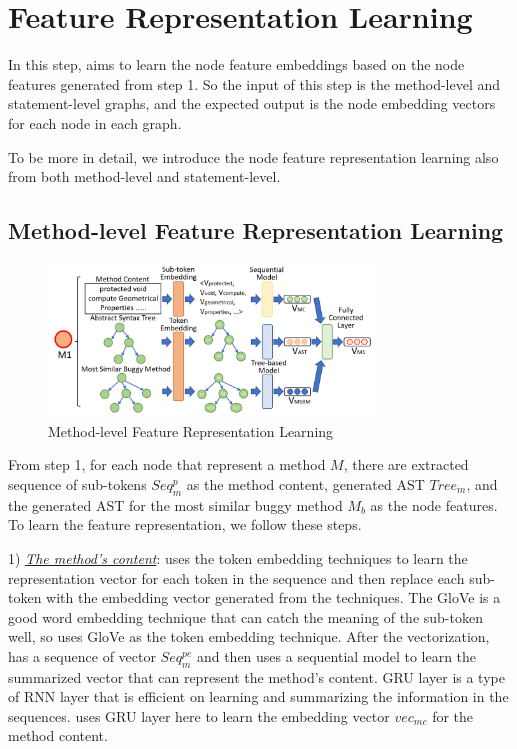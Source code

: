 \section{Feature Representation Learning}
\label{feature-learning:sec}

In this step, \tool aims to learn the node feature embeddings based on the node features generated from step 1. So the input of this step is the method-level and statement-level graphs, and the expected output is the node embedding vectors for each node in each graph.

To be more in detail, we introduce the node feature representation learning also from both method-level and statement-level.

\subsection{Method-level Feature Representation Learning}

\begin{figure}[t]
	\centering
	\includegraphics[width=3.4in]{graphs/step-2-method-new.png}
	\caption{Method-level Feature Representation Learning}
	\label{method-level-feature-learning}
\end{figure}

From step 1, for each node that represent a method $M$, there are extracted sequence of sub-tokens $Seq^p_m$ as the method content, generated AST $Tree_m$, and the generated AST for the most similar buggy method $M_b$ as the node features. To learn the feature representation, we follow these steps.

1) {\em \underline{The method's content}}: \tool uses the token embedding techniques to learn the representation vector for each token in the sequence and then replace each sub-token with the embedding vector generated from the techniques. The GloVe \cite{pennington2014glove} is a good word embedding technique that can catch the meaning of the sub-token well, so \tool uses GloVe as the token embedding technique. After the vectorization, \tool has a sequence of vector $Seq^{pe}_m$ and then uses a sequential model to learn the summarized vector that can represent the method's content.  GRU layer \cite{cho2014learning} is a type of RNN layer that is efficient on learning and summarizing the information in the sequences. \tool uses GRU layer here to learn the embedding vector $vec_{mc}$ for the method content.

